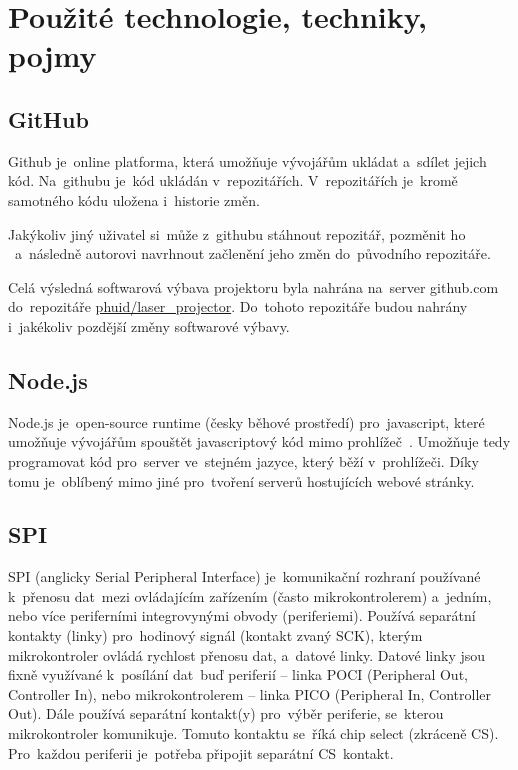 \chapter{Použité technologie, techniky, pojmy}
\section{GitHub}
Github je~online platforma, která umožňuje vývojářům ukládat  a~sdílet jejich kód. Na~githubu je~kód ukládán  v~repozitářích.  V~repozitářích je~kromě samotného kódu uložena  i~historie změn.

Jakýkoliv jiný uživatel si~může  z~githubu stáhnout repozitář, pozměnit ho ~a~následně autorovi navrhnout začlenění jeho změn do~původního repozitáře.

Celá výsledná softwarová výbava projektoru byla nahrána na~server github.com do~repozitáře \href{https://github.com/phuid/laser_projector}{phuid/laser\_projector}. Do~tohoto repozitáře budou nahrány  i~jakékoliv pozdější změny softwarové výbavy.

\section{Node.js}
Node.js je~open-source runtime (česky běhové prostředí)  pro~javascript, které umožňuje vývojářům spouštět javascriptový kód mimo prohlížeč~\cite{nodejs-wiki}.
Umožňuje tedy programovat kód  pro~server ve~stejném jazyce, který běží  v~prohlížeči. Díky tomu je~oblíbený mimo jiné  pro~tvoření serverů hostujících webové stránky.

\section{SPI}\label{sec:spi}
SPI (anglicky Serial Peripheral Interface) je~komunikační rozhraní používané  k~přenosu  dat~mezi ovládajícím zařízením (často mikrokontrolerem)  a~jedním, nebo více periferními integrovynými obvody (periferiemi).
Používá separátní kontakty (linky)  pro~hodinový signál (kontakt zvaný SCK), kterým mikrokontroler ovládá rychlost přenosu dat,  a~datové linky.
Datové linky jsou fixně využívané  k~posílání  dat~buď periferií -- linka POCI (Peripheral Out, Controller In), nebo mikrokontrolerem -- linka PICO (Peripheral In, Controller Out).
Dále používá separátní kontakt(y)  pro~výběr periferie, se~kterou mikrokontroler komunikuje. Tomuto kontaktu se~říká chip select (zkráceně CS).  Pro~každou periferii je~potřeba připojit separátní CS~kontakt.~\cite{sparkfun-spi}

